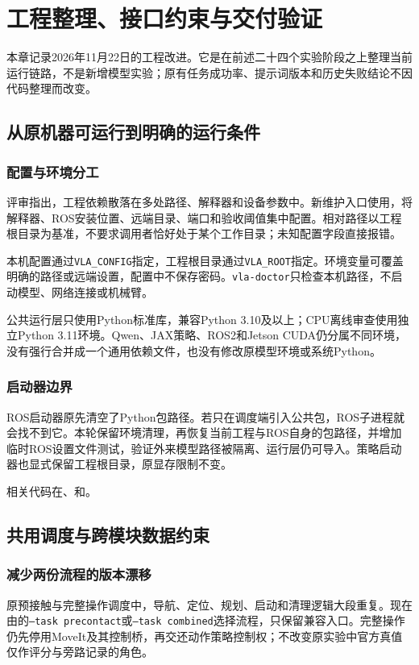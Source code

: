 \chapter{工程整理、接口约束与交付验证}
\label{ch:engineering}
本章记录2026年11月22日的工程改进。它是在前述二十四个实验阶段之上整理当前运行链路，不是新增模型实验；原有任务成功率、提示词版本和历史失败结论不因代码整理而改变。

\section{从原机器可运行到明确的运行条件}
\subsection{配置与环境分工}
评审指出，工程依赖散落在多处路径、解释器和设备参数中。新维护入口使用，将解释器、ROS安装位置、远端目录、端口和验收阈值集中配置。相对路径以工程根目录为基准，不要求调用者恰好处于某个工作目录；未知配置字段直接报错。

本机配置通过\texttt{VLA\_CONFIG}指定，工程根目录通过\texttt{VLA\_ROOT}指定。环境变量可覆盖明确的路径或远端设置，配置中不保存密码。\texttt{vla-doctor}只检查本机路径，不启动模型、网络连接或机械臂。

公共运行层只使用Python标准库，兼容Python 3.10及以上；CPU离线审查使用独立Python 3.11环境。Qwen、JAX策略、ROS2和Jetson CUDA仍分属不同环境，没有强行合并成一个通用依赖文件，也没有修改原模型环境或系统Python。

\subsection{启动器边界}
ROS启动器原先清空了Python包路径。若只在调度端引入公共包，ROS子进程就会找不到它。本轮保留环境清理，再恢复当前工程与ROS自身的包路径，并增加临时ROS设置文件测试，验证外来模型路径被隔离、运行层仍可导入。策略启动器也显式保留工程根目录，原显存限制不变。

相关代码在、和。

\section{共用调度与跨模块数据约束}
\subsection{减少两份流程的版本漂移}
原预接触与完整操作调度中，导航、定位、规划、启动和清理逻辑大段重复。现在由的\texttt{--task precontact}或\texttt{--task combined}选择流程，只保留兼容入口。完整操作仍先停用MoveIt及其控制桥，再交还动作策略控制权；不改变原实验中官方真值仅作评分与旁路记录的角色。

